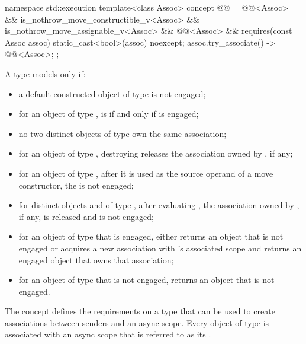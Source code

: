 \begin{codeblock}
namespace std::execution {
  template<class Assoc>
    concept @@ =
      @@<Assoc> &&
      is_nothrow_move_constructible_v<Assoc> &&
      is_nothrow_move_assignable_v<Assoc> &&
      @@<Assoc> &&
      requires(const Assoc assoc) {
        { static_cast<bool>(assoc) } noexcept;
        { assoc.try_associate() } -> @@<Assoc>;
      };
}
\end{codeblock}

\pnum
A type  models  only if:
\begin{itemize}
\item
a default constructed object of type  is not engaged;
\item
for an object  of type ,
 is 
if and only if  is engaged;
\item
no two distinct objects of type  own the same association;
\item
for an object  of type ,
destroying  releases the association owned by , if any;
\item
for an object  of type ,
after it is used as the source operand of a move constructor,
the  is not engaged;
\item
for distinct objects  and  of type ,
after evaluating ,
the association owned by , if any, is released and
 is not engaged;
\item
for an object  of type  that is engaged,
 either
returns an object that is not engaged or
acquires a new association with 's associated scope and
returns an engaged object that owns that association;
\item
for an object  of type  that is not engaged,
 returns an object that is not engaged.
\end{itemize}

\pnum
The  concept defines the requirements on
a type  that can be used to create associations
between senders and an async scope.
Every object of type  is associated with an async scope
that is referred to as its .

